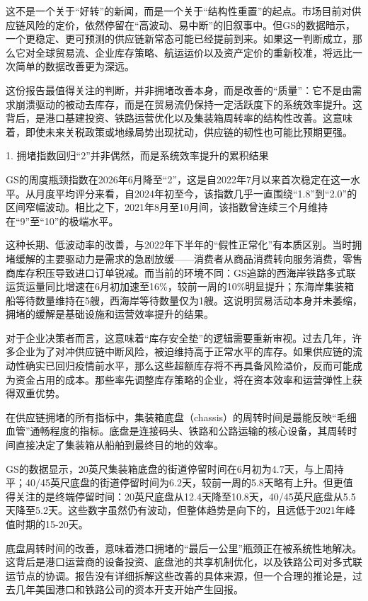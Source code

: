 \documentclass[11pt]{ctexart}
\begin{document}
这不是一个关于“好转”的新闻，而是一个关于“结构性重置”的起点。市场目前对供应链风险的定价，依然停留在“高波动、易中断”的旧叙事中。但GS的数据暗示，一个更稳定、更可预测的供应链新常态可能已经提前到来。如果这一判断成立，那么它对全球贸易流、企业库存策略、航运运价以及资产定价的重新校准，将远比一次简单的数据改善更为深远。

这份报告最值得关注的判断，并非拥堵改善本身，而是改善的“质量”：它不是由需求崩溃驱动的被动去库存，而是在贸易流仍保持一定活跃度下的系统效率提升。这背后，是港口基建投资、铁路运营优化以及集装箱周转率的结构性改善。这意味着，即使未来关税政策或地缘局势出现扰动，供应链的韧性也可能比预期更强。

1. 拥堵指数回归“2”并非偶然，而是系统效率提升的累积结果

GS的周度瓶颈指数在2026年6月降至“2”，这是自2022年7月以来首次稳定在这一水平。从月度平均评分来看，自2024年初至今，该指数几乎一直围绕“1.8”到“2.0”的区间窄幅波动。相比之下，2021年8月至10月间，该指数曾连续三个月维持在“9”至“10”的极端水平。

这种长期、低波动率的改善，与2022年下半年的“假性正常化”有本质区别。当时拥堵缓解的主要驱动力是需求的急剧放缓——消费者从商品消费转向服务消费，零售商库存积压导致进口订单锐减。而当前的环境不同：GS追踪的西海岸铁路多式联运货运量同比增速在6月初加速至16\%，较前一周的10\%明显提升；东海岸集装箱船等待数量维持在5艘，西海岸等待数量仅为1艘。这说明贸易活动本身并未萎缩，拥堵的缓解是基础设施和运营效率提升的结果。

对于企业决策者而言，这意味着“库存安全垫”的逻辑需要重新审视。过去几年，许多企业为了对冲供应链中断风险，被迫维持高于正常水平的库存。如果供应链的流动性确实已回归疫情前水平，那么这些超额库存将不再具备风险溢价，反而可能成为资金占用的成本。那些率先调整库存策略的企业，将在资本效率和运营弹性上获得双重优势。

在供应链拥堵的所有指标中，集装箱底盘（chassis）的周转时间是最能反映“毛细血管”通畅程度的指标。底盘是连接码头、铁路和公路运输的核心设备，其周转时间直接决定了集装箱从船舶到最终目的地的效率。

GS的数据显示，20英尺集装箱底盘的街道停留时间在6月初为4.7天，与上周持平；40/45英尺底盘的街道停留时间为6.2天，较前一周的5.8天略有上升。但更值得关注的是终端停留时间：20英尺底盘从12.4天降至10.8天，40/45英尺底盘从5.5天降至5.2天。这些数字虽然仍有波动，但整体趋势是向下的，且远低于2021年峰值时期的15-20天。

底盘周转时间的改善，意味着港口拥堵的“最后一公里”瓶颈正在被系统性地解决。这背后是港口运营商的设备投资、底盘池的共享机制优化，以及铁路公司对多式联运节点的协调。报告没有详细拆解这些改善的具体来源，但一个合理的推论是，过去几年美国港口和铁路公司的资本开支开始产生回报。
\end{document}

